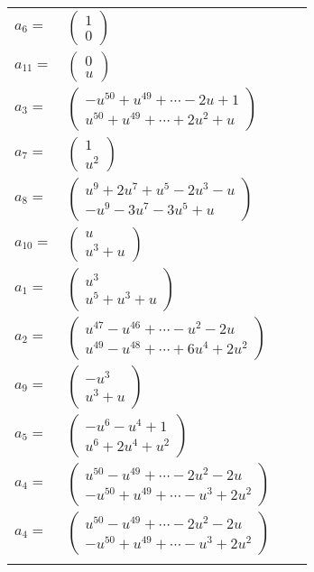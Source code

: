 \documentclass[1p]{elsarticle_modified}
\theoremstyle{definition}
\begin{document}
\begin{tabular}{m{7pt} m{180pt} m{7pt} m{180pt} }
\flushright $a_{6}=$&$\begin{pmatrix}1\\0\end{pmatrix}$ \\
\flushright $a_{11}=$&$\begin{pmatrix}0\\u\end{pmatrix}$ \\
\flushright $a_{3}=$&$\begin{pmatrix}- u^{50}+u^{49}+\cdots-2 u+1\\u^{50}+u^{49}+\cdots+2 u^2+u\end{pmatrix}$ \\
\flushright $a_{7}=$&$\begin{pmatrix}1\\u^2\end{pmatrix}$ \\
\flushright $a_{8}=$&$\begin{pmatrix}u^9+2 u^7+u^5-2 u^3- u\\- u^9-3 u^7-3 u^5+u\end{pmatrix}$ \\
\flushright $a_{10}=$&$\begin{pmatrix}u\\u^3+u\end{pmatrix}$ \\
\flushright $a_{1}=$&$\begin{pmatrix}u^3\\u^5+u^3+u\end{pmatrix}$ \\
\flushright $a_{2}=$&$\begin{pmatrix}u^{47}- u^{46}+\cdots- u^2-2 u\\u^{49}- u^{48}+\cdots+6 u^4+2 u^2\end{pmatrix}$ \\
\flushright $a_{9}=$&$\begin{pmatrix}- u^3\\u^3+u\end{pmatrix}$ \\
\flushright $a_{5}=$&$\begin{pmatrix}- u^6- u^4+1\\u^6+2 u^4+u^2\end{pmatrix}$ \\
\flushright $a_{4}=$&$\begin{pmatrix}u^{50}- u^{49}+\cdots-2 u^2-2 u\\- u^{50}+u^{49}+\cdots- u^3+2 u^2\end{pmatrix}$\\ \flushright $a_{4}=$&$\begin{pmatrix}u^{50}- u^{49}+\cdots-2 u^2-2 u\\- u^{50}+u^{49}+\cdots- u^3+2 u^2\end{pmatrix}$\\&\end{tabular}
\end{document}
